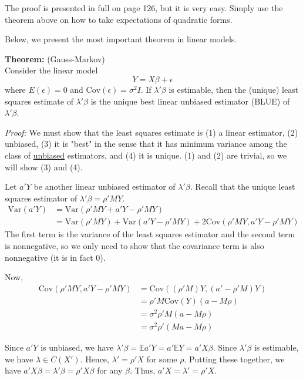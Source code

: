 \documentclass[12pt]{article}
\newcommand{\E}{\mathbb{E}}
\newcommand{\Var}{\mathrm{Var}}
\newcommand{\Cov}{\mathrm{Cov}}
\numberwithin{equation}{section}
\begin{document}
The proof is presented in full on page 126, but it is very easy. Simply use the theorem above on how to take expectations of quadratic forms.

Below, we present the most important theorem in linear models.

\textbf{Theorem:} (Gauss-Markov) \\
Consider the linear model
\begin{equation*}
  Y = X\beta + \epsilon
\end{equation*}
where $E(\epsilon) = 0$ and $\Cov(\epsilon) = \sigma^2 I$. If $\lambda'\beta$ is estimable, then the (unique) least squares estimate of $\lambda'\beta$ is the unique best linear unbiased estimator (BLUE) of $\lambda'\beta$.

\textit{Proof:} We must show that the least squares estimate is (1) a linear estimator, (2) unbiased, (3) it is "best" in the sense that it has minimum variance among the class of \underline{unbiased} estimators, and (4) it is unique. (1) and (2) are trivial, so we will show (3) and (4).

Let $a'Y$ be another linear unbiased estimator of $\lambda ' \beta$. Recall that the unique least squares estimator of $\lambda'\beta = \rho' M Y$.
\begin{align*}
  \Var(a'Y) &= \Var(\rho' MY + a'Y - \rho' MY) \\
    &= \Var(\rho' MY) + \Var(a'Y - \rho' MY) + 2\Cov(\rho'MY, a'Y - \rho'MY)
\end{align*}
The first term is the variance of the least squares estimator and the second term is nonnegative, so we only need to show that the covariance term is also nonnegative (it is in fact 0).

Now,
\begin{align*}
  \Cov(\rho'MY, a'Y - \rho' M Y) 
    &= \Cov((\rho'M)Y, (a' - \rho'M)Y) \\
    &= \rho'M \Cov(Y) (a - M\rho) \\
    &= \sigma^2 \rho'M (a - M\rho) \\
    &= \sigma^2 \rho'(Ma - M\rho)
\end{align*}

Since $a'Y$ is unbiased, we have
$\lambda'\beta = \E a'Y = a'\E Y = a'X\beta$. Since $\lambda'\beta$ is estimable, we have $\lambda \in C(X')$. Hence, $\lambda' = \rho' X$ for some $\rho$. Putting these together, we have $a'X\beta = \lambda'\beta = \rho'X\beta$ for any $\beta$. Thus, $a'X = \lambda' = \rho'X$.
\end{document}
